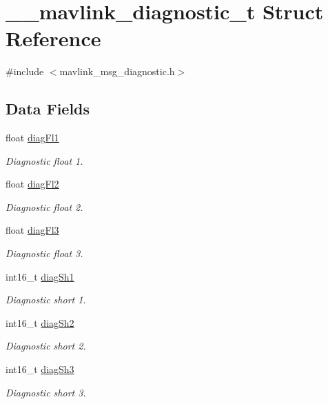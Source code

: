 \hypertarget{struct____mavlink__diagnostic__t}{\section{\+\_\+\+\_\+mavlink\+\_\+diagnostic\+\_\+t Struct Reference}
\label{struct____mavlink__diagnostic__t}
}


{\ttfamily \#include $<$mavlink\+\_\+msg\+\_\+diagnostic.\+h$>$}

\subsection*{Data Fields}
\begin{DoxyCompactItemize}
\item 
float \hyperlink{struct____mavlink__diagnostic__t_a7842b0ebcb7962429e6bfca218a3fb84}{diag\+Fl1}
\begin{DoxyCompactList}\small\item\em Diagnostic float 1. \end{DoxyCompactList}\item 
float \hyperlink{struct____mavlink__diagnostic__t_a5aad21402becec9a5635b18f5634dbb1}{diag\+Fl2}
\begin{DoxyCompactList}\small\item\em Diagnostic float 2. \end{DoxyCompactList}\item 
float \hyperlink{struct____mavlink__diagnostic__t_a56984ef815d3cbef46abcb4ad8f4b5c9}{diag\+Fl3}
\begin{DoxyCompactList}\small\item\em Diagnostic float 3. \end{DoxyCompactList}\item 
int16\+\_\+t \hyperlink{struct____mavlink__diagnostic__t_afe93db87c4f3870a127a05aa2f4d246f}{diag\+Sh1}
\begin{DoxyCompactList}\small\item\em Diagnostic short 1. \end{DoxyCompactList}\item 
int16\+\_\+t \hyperlink{struct____mavlink__diagnostic__t_abf3bfeb2dc62ae1779079d22ef545a96}{diag\+Sh2}
\begin{DoxyCompactList}\small\item\em Diagnostic short 2. \end{DoxyCompactList}\item 
int16\+\_\+t \hyperlink{struct____mavlink__diagnostic__t_a74832766a045beaace2517e27b45f6a2}{diag\+Sh3}
\begin{DoxyCompactList}\small\item\em Diagnostic short 3. \end{DoxyCompactList}\end{DoxyCompactItemize}


